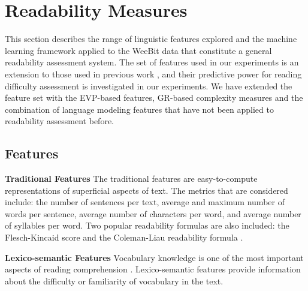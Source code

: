 \documentclass[11pt,letterpaper]{article}
\begin{document}
	\begin{table}[t]
		\centering
		\small
		\caption{Statistics for the Cambridge English Exams data}\label{cameng}
	\end{table}
    

\section{Readability Measures}
    This section describes the range of linguistic features explored and the machine learning framework applied to the WeeBit data that constitute a general readability assessment system. The set of features used in our experiments is an extension to those used in previous work \cite{feng2010comparison,pitler2008revisiting,vajjala2012improving,vajjala2014readability}, and their predictive power for reading difficulty assessment is investigated in our experiments. We have extended the feature set with the EVP-based features, GR-based complexity measures and the combination of language modeling features that have not been applied to readability assessment before.
    
\subsection{Features}    
		
{\bf Traditional Features}
The traditional features are easy-to-compute representations of superficial aspects of text. The metrics that are considered include: the number of sentences per text, average and maximum number of words per sentence, average number of characters per word, and average number of syllables per word. Two popular readability formulas are also included: the Flesch-Kincaid score \cite{kincaid1975derivation} and the Coleman-Liau readability formula \cite{coleman1975computer}.

{\bf Lexico-semantic Features}
Vocabulary knowledge is one of the most important aspects of reading comprehension \cite{collinsthompson2014survey}. Lexico-semantic features provide information about the difficulty or familiarity of vocabulary in the text.
\end{document}

